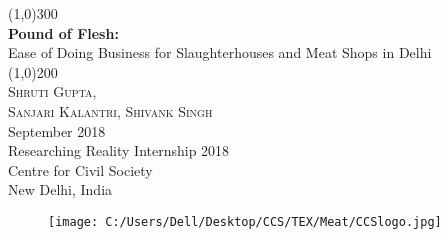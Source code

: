 \documentclass[a4paper, 12pt]{article}
\begin{document}
\begin{titlepage}
\begin{center}
\line(1,0){300}\\
[0.25in]
\huge{\bfseries \textcolor{CCSbrown} {Pound of Flesh: }} \\
[0.5cm]
\large {Ease of Doing Business for Slaughterhouses and Meat Shops in Delhi} \\
\line(1,0){200}\\
[1in]
\textsc{\huge Shruti Gupta, \\ Sanjari Kalantri, Shivank Singh} \\
[1.5cm]
{\Large September 2018} \\
[2.0cm]
{\huge Researching Reality Internship 2018} \\
{\LARGE Centre for Civil Society} \\
[0.1mm]
{\Large New Delhi, India} \\
[2.0cm]
\begin{figure}[H]
\centering
\texttt{[image: C:/Users/Dell/Desktop/CCS/TEX/Meat/CCSlogo.jpg]}
\end{figure}
\end{center}
\end{titlepage}
\tableofcontents
\newpage
{}
\end{document}
